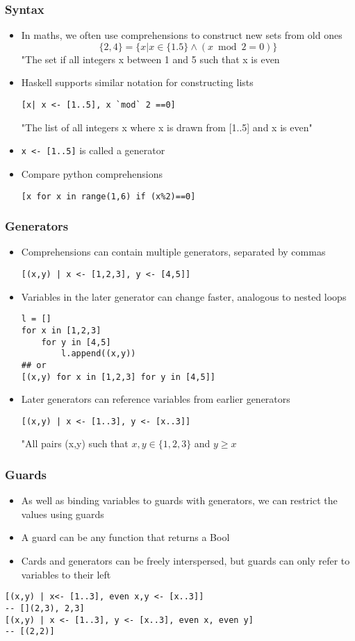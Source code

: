 \documentclass{article}[18pt]
\begin{document}
\subsubsection{Syntax}
\begin{itemize}
	\item In maths, we often use comprehensions to construct new sets from old ones
\[
\{2,4\}=\{x | x \in\{1.5\} \wedge(x \bmod 2=0)\}
\]
"The set if all integers x between 1 and 5 such that x is even
	\item Haskell supports similar notation for constructing lists
\begin{verbatim}
[x| x <- [1..5], x `mod` 2 ==0]
\end{verbatim}
"The list of all integers x where x is drawn from [1..5] and x is even"
	\item \texttt{x <- [1..5]} is called a generator
	\item Compare python comprehensions
\begin{verbatim}
[x for x in range(1,6) if (x%2)==0]
\end{verbatim}
\end{itemize}
\subsubsection{Generators}
\begin{itemize}
	\item Comprehensions can contain multiple generators, separated by commas
\begin{verbatim}
[(x,y) | x <- [1,2,3], y <- [4,5]]
\end{verbatim}
	\item Variables in the later generator can change faster, analogous to nested loops
\begin{verbatim}
l = []
for x in [1,2,3]
	for y in [4,5]
		l.append((x,y))
## or
[(x,y) for x in [1,2,3] for y in [4,5]]
\end{verbatim}
	\item Later generators can reference variables from earlier generators
\begin{verbatim}
[(x,y) | x <- [1..3], y <- [x..3]]
\end{verbatim}
"All pairs (x,y) such that $x,y\in \{1,2,3\}$ and $y\geqslant x$
\end{itemize}
\subsubsection{Guards}
\begin{itemize}
	\item As well as binding variables to guards with generators, we can restrict the values using guards
	\item A guard can be any function that returns a Bool
	\item Cards and generators can be freely interspersed, but guards can only refer to variables to their left
\end{itemize}
\begin{verbatim}
[(x,y) | x<- [1..3], even x,y <- [x..3]]
-- [](2,3), 2,3]
[(x,y) | x <- [1..3], y <- [x..3], even x, even y]
-- [(2,2)]
\end{verbatim}
\end{document}
